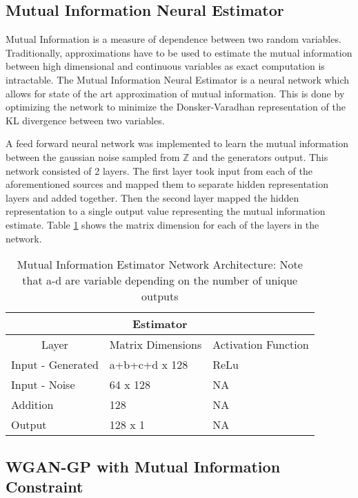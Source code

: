 \subsection{Mutual Information Neural Estimator}
\label{sec:mine}
Mutual Information is a measure of dependence between two random variables. Traditionally, approximations have to be used to estimate the mutual information between high dimensional and continuous variables as exact computation is intractable. The Mutual Information Neural Estimator is a neural network which allows for state of the art approximation of mutual information. This is done by optimizing the network to minimize the Donsker-Varadhan representation of the KL divergence between two variables. 

A feed forward neural network was implemented to learn the mutual information between the gaussian noise sampled from $\mathbb{Z}$ and the generators output. This network consisted of 2 layers. The first layer took input from each of the aforementioned sources and mapped them to separate hidden representation layers and added together. Then the second layer mapped the hidden representation to a single output value representing the mutual information estimate. Table \ref{tab:model_mi} shows the matrix dimension for each of the layers in the network.

\begin{table}[!htbp]
	\centering
	\label{tab:model_mi}
	\caption{Mutual Information Estimator Network Architecture: Note that a-d are variable depending on the number of unique outputs}
	\begin{tabular}{l|l|l}
		\hline
		\multicolumn{3}{c}{\textbf{Estimator}} \\ 
		\hline
		\multicolumn{1}{c|}{Layer} & \multicolumn{1}{c|}{Matrix Dimensions} & \multicolumn{1}{c}{Activation Function} \\ \hline
		Input - Generated & a+b+c+d x 128 & ReLu \\
		Input - Noise & 64 x 128 & NA \\
		Addition & 128 & NA \\ 
		Output & 128 x 1 &  NA \\
		\hline
	\end{tabular}
\end{table}


\subsection{WGAN-GP with Mutual Information Constraint}
\label{sec:gpmi}

